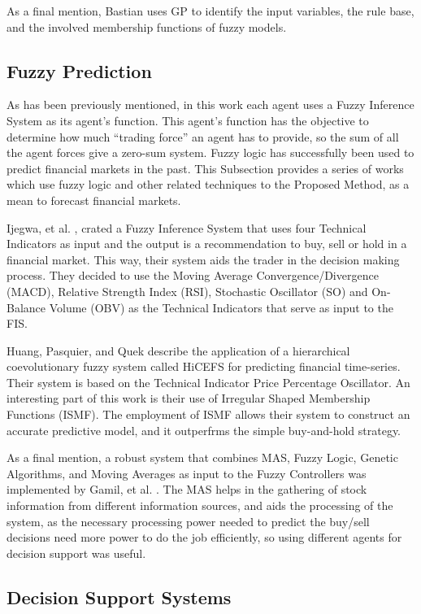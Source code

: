 \documentclass[12pt,journal,draftcls,onecolumn]{IEEEtran}
\begin{document}
As a final mention, Bastian \cite{Bastian2000} uses GP to identify the input variables, the rule base, and the involved membership functions of fuzzy models.

\subsection{Fuzzy Prediction}
\label{fuzzy-prediction}

As has been previously mentioned, in this work each agent uses a Fuzzy Inference System as its agent's function. This agent's function has the objective to determine how much ``trading force'' an agent has to provide, so the sum of all the agent forces give a zero-sum system. Fuzzy logic has successfully been used to predict financial markets in the past. This Subsection provides a series of works which use fuzzy logic and other related techniques to the Proposed Method, as a mean to forecast financial markets.

Ijegwa, et al. \cite{Ijegwa2014}, crated a Fuzzy Inference System that uses four Technical Indicators as input and the output is a recommendation to buy, sell or hold in a financial market. This way, their system aids the trader in the decision making process. They decided to use the Moving Average Convergence/Divergence (MACD), Relative Strength Index (RSI), Stochastic Oscillator (SO) and On-Balance Volume (OBV) as the Technical Indicators that serve as input to the FIS.

Huang, Pasquier, and Quek \cite{Huang2009} describe the application of a hierarchical coevolutionary fuzzy system called HiCEFS for predicting financial time-series. Their system is based on the Technical Indicator Price Percentage Oscillator. An interesting part of this work is their use of Irregular Shaped Membership Functions (ISMF). The employment of ISMF allows their system to construct an accurate predictive model, and it outperfrms the simple buy-and-hold strategy.

As a final mention, a robust system that combines MAS, Fuzzy Logic, Genetic Algorithms, and Moving Averages as input to the Fuzzy Controllers was implemented by Gamil, et al. \cite{Gamil2007}. The MAS helps in the gathering of stock information from different information sources, and aids the processing of the system, as the necessary processing power needed to predict the buy/sell decisions need more power to do the job efficiently, so using different agents for decision support was useful.

\subsection{Decision Support Systems}
\label{decision-support-systems}
\end{document}
